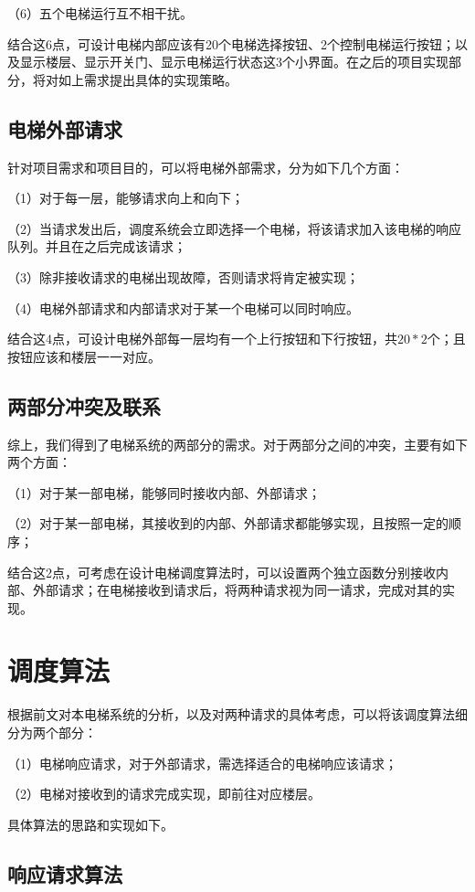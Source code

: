 \documentclass{article}
\begin{document}
\begin{CJK}{UTF8}{gbsn}
（6）五个电梯运行互不相干扰。

结合这6点，可设计电梯内部应该有20个电梯选择按钮、2个控制电梯运行按钮；以及显示楼层、显示开关门、显示电梯运行状态这3个小界面。在之后的项目实现部分，将对如上需求提出具体的实现策略。

\subsection{电梯外部请求}
针对项目需求和项目目的，可以将电梯外部需求，分为如下几个方面：

（1）对于每一层，能够请求向上和向下；

（2）当请求发出后，调度系统会立即选择一个电梯，将该请求加入该电梯的响应队列。并且在之后完成该请求；

（3）除非接收请求的电梯出现故障，否则请求将肯定被实现；

（4）电梯外部请求和内部请求对于某一个电梯可以同时响应。

结合这4点，可设计电梯外部每一层均有一个上行按钮和下行按钮，共$20*2$个；且按钮应该和楼层一一对应。

\subsection{两部分冲突及联系}

综上，我们得到了电梯系统的两部分的需求。对于两部分之间的冲突，主要有如下两个方面：

（1）对于某一部电梯，能够同时接收内部、外部请求；

（2）对于某一部电梯，其接收到的内部、外部请求都能够实现，且按照一定的顺序；

结合这2点，可考虑在设计电梯调度算法时，可以设置两个独立函数分别接收内部、外部请求；在电梯接收到请求后，将两种请求视为同一请求，完成对其的实现。

\vspace{3em}

\section{调度算法}

根据前文对本电梯系统的分析，以及对两种请求的具体考虑，可以将该调度算法细分为两个部分：

（1）电梯响应请求，对于外部请求，需选择适合的电梯响应该请求；

（2）电梯对接收到的请求完成实现，即前往对应楼层。

具体算法的思路和实现如下。

\subsection{响应请求算法}


\end{CJK}
\end{document}
